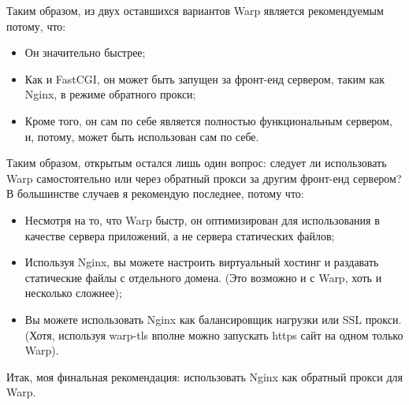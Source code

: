 %
Таким образом, из двух оставшихся вариантов Warp является рекомендуемым потому, что:
\begin{itemize}
  \item Он значительно быстрее;
  \item Как и FastCGI, он может быть запущен за фронт-енд сервером, таким как Nginx, в режиме обратного прокси;
  \item Кроме того, он сам по себе является полностью функциональным сервером, и, потому, может быть использован сам по себе.
\end{itemize}
%
%
%

Таким образом, открытым остался лишь один вопрос: следует ли использовать Warp самостоятельно или через обратный прокси за другим фронт-енд сервером? В большинстве случаев я рекомендую последнее, потому что:
\begin{itemize}
  \item Несмотря на то, что Warp быстр, он оптимизирован для использования в качестве сервера приложений, а не сервера статических файлов;
  \item Используя Nginx, вы можете настроить виртуальный хостинг и раздавать статические файлы с отдельного домена. (Это возможно и с Warp, хоть и несколько сложнее);
  \item Вы можете использовать Nginx как балансировщик нагрузки или SSL прокси. (Хотя, используя warp-tls вполне можно запускать https сайт на одном только Warp).
\end{itemize}

Итак, моя финальная рекомендация: использовать Nginx как обратный прокси для Warp.

